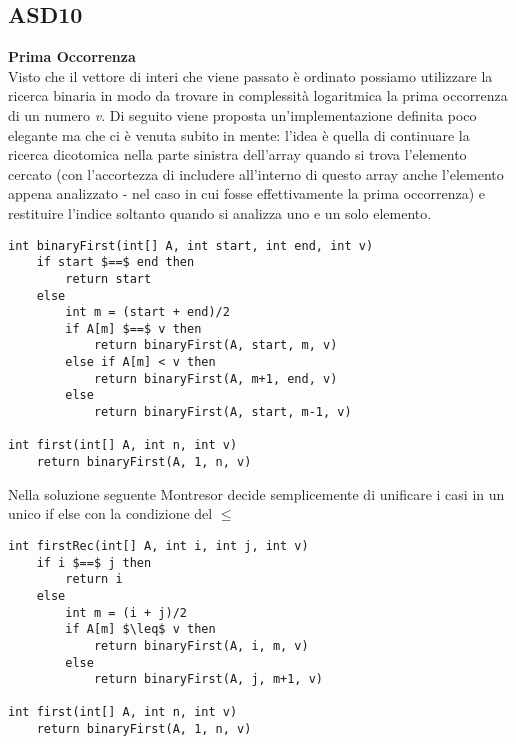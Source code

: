 \documentclass[../cheatSheetAlgoritmi.tex]{subfiles}
\begin{document}
\subsection{ASD10}
\textbf{Prima Occorrenza}\\
Visto che il vettore di interi che viene passato è ordinato possiamo utilizzare la ricerca binaria in modo da trovare in complessità logaritmica la prima occorrenza di un numero \textit{v}. Di seguito viene proposta un'implementazione definita poco elegante ma che ci è venuta subito in mente: l'idea è quella di continuare la ricerca dicotomica nella parte sinistra dell'array quando si trova l'elemento cercato (con l'accortezza di includere all'interno di questo array anche l'elemento appena analizzato - nel caso in cui fosse effettivamente la prima occorrenza) e restituire l'indice soltanto quando si analizza uno e un solo elemento.
\begin{lstlisting}[caption=Prima Occorrenza]
int binaryFirst(int[] A, int start, int end, int v)
	if start $==$ end then
		return start
  	else
    	int m = (start + end)/2
    	if A[m] $==$ v then
      		return binaryFirst(A, start, m, v)
    	else if A[m] < v then
        	return binaryFirst(A, m+1, end, v)
      	else
        	return binaryFirst(A, start, m-1, v)

int first(int[] A, int n, int v)
	return binaryFirst(A, 1, n, v)
\end{lstlisting}
Nella soluzione seguente Montresor decide semplicemente di unificare i casi in un unico if else con la condizione del $\leq$
\begin{lstlisting}[caption=Prima Occorrenza (by Montresor)]
int firstRec(int[] A, int i, int j, int v)
	if i $==$ j then
    	return i
  	else
    	int m = (i + j)/2
    	if A[m] $\leq$ v then
      		return binaryFirst(A, i, m, v)
    	else
      		return binaryFirst(A, j, m+1, v)
      
int first(int[] A, int n, int v)
	return binaryFirst(A, 1, n, v)
\end{lstlisting}
\end{document}
